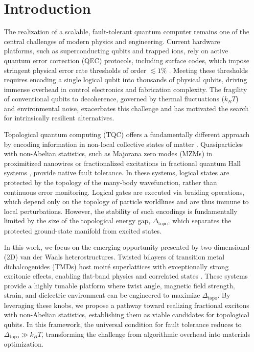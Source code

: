 \documentclass[aps,prl,twocolumn,superscriptaddress]{revtex4-2}
\begin{document}
\maketitle

\section{Introduction}

The realization of a scalable, fault-tolerant quantum computer remains one of the central challenges of modern physics and engineering. Current hardware platforms, such as superconducting qubits and trapped ions, rely on active quantum error correction (QEC) protocols, including surface codes, which impose stringent physical error rate thresholds of order $\lesssim 1\%$ \cite{Fowler2012,Terhal2015}. Meeting these thresholds requires encoding a single logical qubit into thousands of physical qubits, driving immense overhead in control electronics and fabrication complexity. The fragility of conventional qubits to decoherence, governed by thermal fluctuations ($k_B T$) and environmental noise, exacerbates this challenge and has motivated the search for intrinsically resilient alternatives.

Topological quantum computing (TQC) offers a fundamentally different approach by encoding information in non-local collective states of matter \cite{Kitaev2001,Nayak2008,Alicea2012}. Quasiparticles with non-Abelian statistics, such as Majorana zero modes (MZMs) in proximitized nanowires \cite{Sarma2015} or fractionalized excitations in fractional quantum Hall systems \cite{Laughlin1983,Stormer1999}, provide native fault tolerance. In these systems, logical states are protected by the topology of the many-body wavefunction, rather than continuous error monitoring. Logical gates are executed via braiding operations, which depend only on the topology of particle worldlines and are thus immune to local perturbations. However, the stability of such encodings is fundamentally limited by the size of the topological energy gap, $\Delta_{\text{topo}}$, which separates the protected ground-state manifold from excited states.

In this work, we focus on the emerging opportunity presented by two-dimensional (2D) van der Waals heterostructures. Twisted bilayers of transition metal dichalcogenides (TMDs) host moiré superlattices with exceptionally strong excitonic effects, enabling flat-band physics and correlated states \cite{Dean2013,Cao2018,Tang2020,Kennes2021,Andrei2021}. These systems provide a highly tunable platform where twist angle, magnetic field strength, strain, and dielectric environment can be engineered to maximize $\Delta_{\text{topo}}$. By leveraging these knobs, we propose a pathway toward realizing fractional excitons with non-Abelian statistics, establishing them as viable candidates for topological qubits. In this framework, the universal condition for fault tolerance reduces to $\Delta_{\text{topo}} \gg k_B T$, transforming the challenge from algorithmic overhead into materials optimization.
\end{document}
